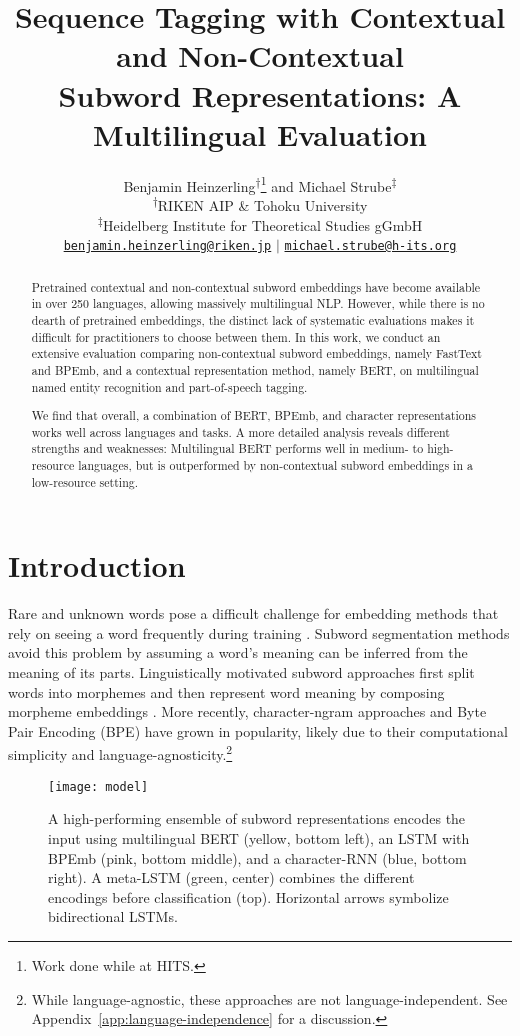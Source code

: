 \documentclass[11pt,a4paper]{article}
\title{Sequence Tagging with Contextual and Non-Contextual \\
	Subword Representations: A Multilingual Evaluation}
\author{Benjamin Heinzerling\textsuperscript{\textnormal{$\dag$}}\thanks{\hspace{0.4em} Work done while at HITS.} \hspace{0.18em} \textnormal{and}\hspace{0.09em} Michael Strube\textsuperscript{\textnormal{$\ddag$}}\\
\vspace{0.1ex}
  \textsuperscript{\textnormal{$\dag$}}RIKEN AIP \& Tohoku University \\
\vspace{0.1ex}
  \textsuperscript{\textnormal{$\ddag$}}Heidelberg Institute for Theoretical Studies gGmbH \\
\vspace{0.1ex}
  \hypersetup{urlcolor=black}\href{mailto:benjamin.heinzerling@riken.jp}{\tt benjamin.heinzerling@riken.jp} \hspace{0.06em} $\vert$ \hspace{0.12em} \hypersetup{urlcolor=black}\href{mailto:michael.strube@h-its.org}{\tt michael.strube@h-its.org} \\
}
\date{}
\begin{document}
\maketitle
\begin{abstract}
Pretrained contextual and non-contextual subword embeddings have become available in over 250 languages, allowing massively multilingual NLP.
However, while there is no dearth of pretrained embeddings, the distinct lack of systematic evaluations makes it difficult for practitioners to choose between them.
In this work, we conduct an extensive evaluation comparing non-contextual subword embeddings, namely FastText and BPEmb, and a contextual representation method, namely BERT, on multilingual named entity recognition and part-of-speech tagging.

We find that overall, a combination of BERT, BPEmb, and character representations works well across languages and tasks.
A more detailed analysis reveals different strengths and weaknesses: Multilingual BERT performs well in medium- to high-resource languages, but is outperformed by non-contextual subword embeddings in a low-resource setting.

\end{abstract}

\section{Introduction}

Rare and unknown words pose a difficult challenge for embedding methods that rely on seeing a word frequently during training \citep{bullinaria2007extracting,luong2013word}.
Subword segmentation methods avoid this problem by assuming a word's meaning can be inferred from the meaning of its parts.
Linguistically motivated subword approaches first split words into morphemes and then represent word meaning by composing morpheme embeddings \citep{luong2013word}.
More recently, character-ngram approaches \citep{luong2016open,bojanowski2017subword} and Byte Pair Encoding (BPE) \citep{sennrich2016subword} have grown in popularity, likely due to their computational simplicity and language-agnosticity.\footnote{While language-agnostic, these approaches are not language-independent. See Appendix~\ref{app:language-independence} for a discussion.}

\begin{figure}[t!]
	\centering
	\texttt{[image: model]}
	\caption{A high-performing ensemble of subword representations encodes the input using multilingual BERT (yellow, bottom left), an LSTM with BPEmb (pink, bottom middle), and a character-RNN (blue, bottom right). A meta-LSTM (green, center) combines the different encodings before classification (top). Horizontal arrows symbolize bidirectional LSTMs.}
	\label{fig:model}
\end{figure}
\end{document}

